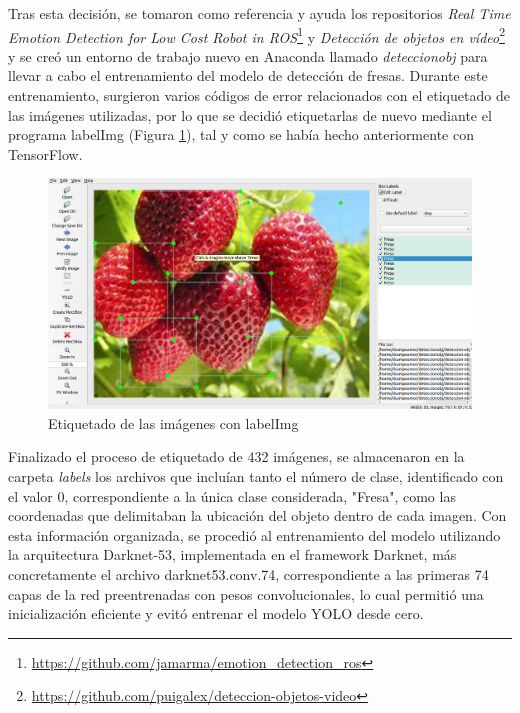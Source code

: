 Tras esta decisión, se tomaron como referencia y ayuda los repositorios \textit{Real Time Emotion Detection for Low Cost Robot in ROS}\footnote{\url{https://github.com/jamarma/emotion_detection_ros}} y \textit{Detección de objetos en vídeo}\footnote{\url{https://github.com/puigalex/deteccion-objetos-video}} y se creó un entorno de trabajo nuevo en Anaconda llamado \textit{deteccionobj} para llevar a cabo el entrenamiento del modelo de detección de fresas. Durante este entrenamiento, surgieron varios códigos de error relacionados con el etiquetado de las imágenes utilizadas, por lo que se decidió etiquetarlas de nuevo mediante el programa labelImg (Figura \ref{fig:labelImg_Fresas}), tal y como se había hecho anteriormente con TensorFlow.

 \begin{figure}[H]
     \centering
     \begin{center}
       \includegraphics[width=150mm]{figs/labelImg Fresa.png}
     \end{center}
     \caption{Etiquetado de las imágenes con labelImg}
    \label{fig:labelImg_Fresas}
  \end{figure}

Finalizado el proceso de etiquetado de 432 imágenes, se almacenaron en la carpeta \textit{labels} los archivos que incluían tanto el número de clase, identificado con el valor 0, correspondiente a la única clase considerada, "Fresa",  como las coordenadas que delimitaban la ubicación del objeto dentro de cada imagen. Con esta información organizada, se procedió al entrenamiento del modelo utilizando la arquitectura Darknet-53, implementada en el framework Darknet, más concretamente el archivo darknet53.conv.74, correspondiente a las primeras 74 capas de la red preentrenadas con pesos convolucionales, lo cual permitió una inicialización eficiente y evitó entrenar el modelo YOLO desde cero.

